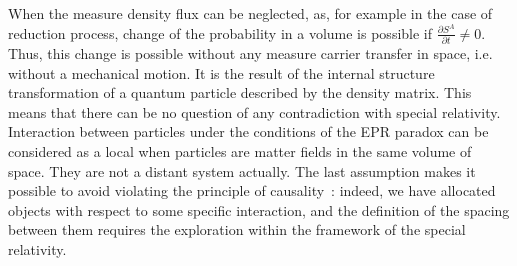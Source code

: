 When the measure density flux can be neglected, as, for example in the case of reduction process, change of the probability in a volume is possible if $\frac{\partial S^A}{\partial t}\neq 0$. Thus, this change is possible without any measure carrier transfer in space, i.e. without a mechanical motion. It is the result of the internal structure transformation of a quantum particle described by the density matrix. This means that there can be no question of any contradiction with special relativity. Interaction between particles under the conditions of the EPR paradox can be considered as a local when particles are matter fields in the same volume of space. They are not a distant system actually. The last assumption makes it possible to avoid violating the principle of causality~\cite{bib:21}: indeed, we have allocated objects with respect to some specific interaction, and the definition of the spacing between them requires the exploration within the framework of the special relativity.  
 



\pagebreak


